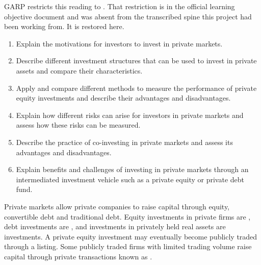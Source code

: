 

\begin{imtrapbox}[breakable=false,title={A scope restriction the transcribed spine had dropped}]
GARP restricts this reading to . That
restriction is in the official learning objective document and was absent from the
transcribed spine this project had been working from. It is restored here.
\end{imtrapbox}

\begin{imkeybox}[title={The six objectives in this reading}]
\begin{enumerate}[label=\textbf{\alph*.}]
\item Explain the motivations for investors to invest in private markets.
\item Describe different investment structures that can be used to invest in private assets and compare their characteristics.
\item Apply and compare different methods to measure the performance of private equity investments and describe their advantages and disadvantages.
\item Explain how different risks can arise for investors in private markets and assess how these risks can be measured.
\item Describe the practice of co-investing in private markets and assess its advantages and disadvantages.
\item Explain benefits and challenges of investing in private markets through an intermediated investment vehicle such as a private equity or private debt fund.
\end{enumerate}
\end{imkeybox}


Private markets allow private companies to raise capital through equity,
convertible debt and traditional debt. Equity investments in private firms are
, debt investments are , and
investments in privately held real assets are 
investments. A private equity investment may eventually become publicly traded
through a listing. Some publicly traded firms with limited trading volume raise
capital through private transactions known as .

